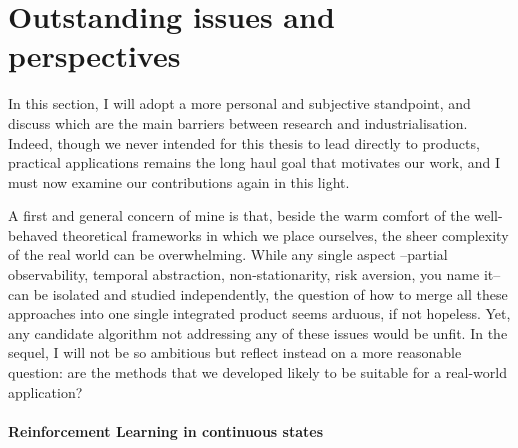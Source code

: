 \section{Outstanding issues and perspectives}

In this section, I will adopt a more personal and subjective standpoint, and discuss which are the main barriers between research and industrialisation. Indeed, though we never intended for this thesis to lead directly to products, practical applications remains the long haul goal that motivates our work, and I must now examine our contributions again in this light.

A first and general concern of mine is that, beside the warm comfort of the well-behaved theoretical frameworks in which we place ourselves, the sheer complexity of the real world can be overwhelming. While any single aspect --partial observability, temporal abstraction, non-stationarity, risk aversion, you name it-- can be isolated and studied independently, the question of how to merge all these approaches into one single integrated product seems arduous, if not hopeless. Yet, any candidate algorithm not addressing any of these issues would be unfit.
In the sequel, I will not be so ambitious but reflect instead on a more reasonable question: are the methods that we developed likely to be suitable for a real-world application?

\paragraph{Reinforcement Learning in continuous states}

